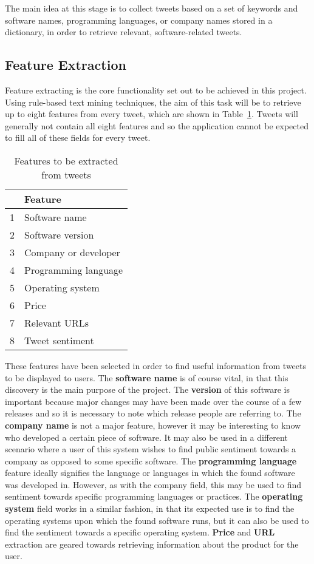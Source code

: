 The main idea at this stage is to collect tweets based on a set of keywords and software names, programming languages, or company names stored in a dictionary, in order to retrieve relevant, software-related tweets.

\subsection{Feature Extraction}
Feature extracting is the core functionality set out to be achieved in this project. Using rule-based text mining techniques, the aim of this task will be to retrieve up to eight features from every tweet, which are shown in Table~\ref{features}. Tweets will generally not contain all eight features and so the application cannot be expected to fill all of these fields for every tweet.

\begin{table}
\begin{center}
\begin{tabular}{|r|l|}\hline\hline
&Feature\\\hline
1&Software name\\
2&Software version\\
3&Company or developer\\
4&Programming language\\
5&Operating system\\
6&Price\\
7&Relevant URLs\\
8&Tweet sentiment\\\hline\hline
\end{tabular}
\end{center}
\caption{Features to be extracted from tweets}\label{features}
\end{table}

These features have been selected in order to find useful information from tweets to be displayed to users. The \textbf{software name} is of course vital, in that this discovery is the main purpose of the project. The \textbf{version} of this software is important because major changes may have been made over the course of a few releases and so it is necessary to note which release people are referring to. The \textbf{company name} is not a major feature, however it may be interesting to know who developed a certain piece of software. It may also be used in a different scenario where a user of this system wishes to find public sentiment towards a company as opposed to some specific software. The \textbf{programming language} feature ideally signifies the language or languages in which the found software was developed in. However, as with the company field, this may be used to find sentiment towards specific programming languages or practices. The \textbf{operating system} field works in a similar fashion, in that its expected use is to find the operating systems upon which the found software runs, but it can also be used to find the sentiment towards a specific operating system. \textbf{Price} and \textbf{URL} extraction are geared towards retrieving information about the product for the user. 

